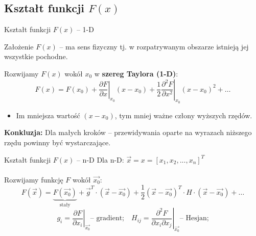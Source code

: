 \subsection{Kształt funkcji $ F(x) $}
  \begin{frame}{Kształt funkcji $ F(x) $ -- 1-D}
    \begin{block}{Założenie}
      $ F(x) $ -- ma sens fizyczny tj. w rozpatrywanym
      obszarze istnieją jej wszystkie pochodne.
    \end{block}
    Rozwijamy $F(x)$ wokół $x_0$ w \textbf{szereg Taylora (1-D)}:
    \begin{displaymath}
      F(x) = F(x_0) + \left. \frac{\partial F}{\partial x} \right|_{x_0}(x - x_0) +
      \left. \frac{1}{2} \frac{\partial^2 F}{\partial x^2} \right|_{x_0}(x - x_0)^2 +
      \dots
    \end{displaymath}
    \begin{itemize}
      \item Im mniejsza wartość $ (x - x_0) $, tym mniej ważne człony
      wyższych rzędów.
    \end{itemize}
    \textbf{Konkluzja:} Dla małych kroków -- przewidywania oparte
    na wyrazach niższego rzędu powinny być wystarczające.

  \end{frame}

  \begin{frame}{Kształt funkcji $ F(x) $ -- n-D}
    Dla n-D: $ \vec{x} = x = [x_1, x_2, ..., x_n]^T $ \\
    \text{ } \\
    Rozwijamy funkcję $ F $ wokół $ \vec{x_0} $:
    \begin{displaymath}
      F(\vec{x}) = \underbrace{F(\vec{x_0})}_{\text{stały}} +
      \vec{g}^T \cdot (\vec{x} - \vec{x_0}) +
      \frac{1}{2}(\vec{x} - \vec{x_0})^T \cdot H \cdot (\vec{x} - \vec{x_0}) + \dots
    \end{displaymath}
    \begin{displaymath}
      g_i = \left. \frac{\partial F}{\partial x_i} \right|_{\vec{x_0}} \text{-- gradient;}\quad
      H_{ij} = \left. \frac{\partial^2 F}{\partial x_i \partial x_j} \right|_{\vec{x_0}}\text{-- Hesjan;}
    \end{displaymath}

  \end{frame}

